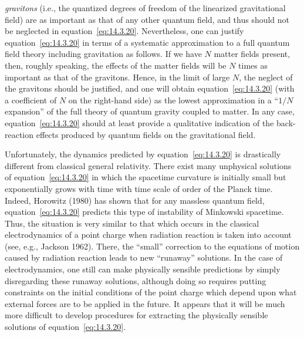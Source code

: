 \emph{gravitons} (i.e., the quantized degrees of freedom of the linearized
gravitational field) are as important as that of any other quantum field, and thus
should not be neglected in equation~\eqref{eq:14.3.20}. Nevertheless, one can
justify equation~\eqref{eq:14.3.20} in terms of a systematic approximation to a full
quantum field theory including gravitation as follows. If we have \(N\) matter fields
present, then, roughly speaking, the effects of the matter fields will be \(N\) times as
important as that of the gravitons. Hence, in the limit of large \(N\), the neglect of
the gravitons should be justified, and one will obtain equation~\eqref{eq:14.3.20}
(with a coefficient of \(N\) on the right-hand side) as the lowest approximation in a
``\(1/N\) expansion'' of the full theory of quantum gravity coupled to matter. In any
case, equation~\eqref{eq:14.3.20} should at least provide a qualitative indication of
the back-reaction effects produced by quantum fields on the gravitational field.

Unfortunately, the dynamics predicted by equation~\eqref{eq:14.3.20} is drastically
different from classical general relativity. There exist many unphysical solutions of
equation~\eqref{eq:14.3.20} in which the spacetime curvature is initially small but
exponentially grows with time with time scale of order of the Planck time. Indeed,
Horowitz (1980) has shown that for any massless quantum field,
equation~\eqref{eq:14.3.20} predicts this type of instability of Minkowski spacetime.
Thus, the situation is very similar to that which occurs in the classical
electrodynamics of a point charge when radiation reaction is taken into account (see,
e.g., Jackson 1962). There, the ``small'' correction to the equations of motion caused
by radiation reaction leads to new ``runaway'' solutions. In the case of
electrodynamics, one still can make physically sensible predictions by simply
disregarding these runaway solutions, although doing so requires putting constraints
on the initial conditions of the point charge which depend upon what external forces
are to be applied in the future. It appears that it will be much more difficult to
develop procedures for extracting the physically sensible solutions of
equation~\eqref{eq:14.3.20}.

